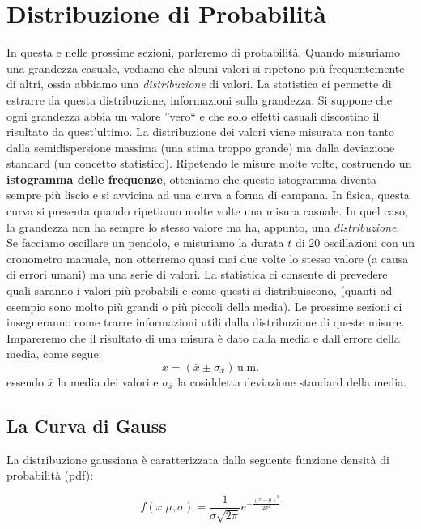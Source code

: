 \documentclass[a4paper,12pt]{article}
\begin{document}
\section{Distribuzione di Probabilità}
In questa e nelle prossime sezioni, parleremo di probabilità. Quando misuriamo una grandezza casuale, vediamo che alcuni valori si ripetono più frequentemente di altri, ossia abbiamo una \textit{distribuzione} di valori. La statistica ci permette di estrarre da questa distribuzione, informazioni sulla grandezza. Si suppone che ogni grandezza abbia un valore ''vero`` e che solo effetti casuali discostino il risultato da quest'ultimo. La distribuzione dei valori viene misurata non tanto dalla semidispersione massima (una stima troppo grande) ma dalla deviazione standard (un concetto statistico). Ripetendo le misure molte volte, costruendo un   \textbf{istogramma delle frequenze}, otteniamo che questo istogramma diventa sempre  più liscio e  si avvicina ad una curva a forma di campana. In fisica, questa curva si presenta quando ripetiamo molte volte una misura casuale. In quel caso, la grandezza non ha sempre lo stesso valore ma ha, appunto, una \textit{distribuzione}. Se facciamo oscillare un pendolo, e misuriamo la durata $t$ di 20 oscillazioni con un cronometro manuale, non otterremo quasi mai due volte lo stesso valore (a causa di errori umani) ma una serie di valori. La statistica ci consente di prevedere quali saranno i valori più probabili e come questi si distribuiscono, (quanti ad esempio sono molto più grandi o più piccoli della media). Le prossime sezioni ci insegneranno come trarre informazioni utili dalla distribuzione di queste misure. Impareremo che il risultato di una misura è dato dalla media e dall'errore della media, come segue:
\[
x=\left(\overline{x} \pm \sigma_{\overline{x}}\right) \, \text{u.m.}
\]
essendo $\overline{x}$ la media dei valori e $\sigma_{\overline{x}}$ la cosiddetta deviazione standard della media.

\subsection{La Curva di Gauss}

La distribuzione gaussiana è caratterizzata dalla seguente funzione densità di probabilità (pdf):

\begin{equation}
f(x|\mu,\sigma) = \frac{1}{\sigma \sqrt{2\pi}} e^{-\frac{(x-\mu)^2}{2\sigma^2}}
\label{eq:gauss}
\end{equation}
\end{document}
